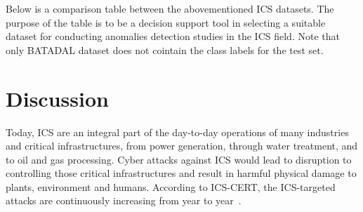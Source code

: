 \documentclass[english,12pt]{article}
\begin{document}
Below is a comparison table between the abovementioned ICS datasets. The purpose of the table is to be a
decision support tool in selecting a suitable dataset for conducting anomalies detection studies in the
ICS field. Note that only BATADAL dataset does not cointain the class labels for the test set.

\pagebreak{}

\section{Discussion} \label{discussion}

Today, ICS are an integral part of the day-to-day operations of many industries and critical infrastructures,
from power generation, through water treatment, and to oil and gas processing. Cyber attacks against ICS would
lead to disruption to controlling those critical infrastructures and result in harmful physical damage to plants,
environment and humans. According to ICS-CERT, the ICS-targeted attacks are continuously increasing from year to year~\cite{DBLP:conf/dsn/FengLC17}.

\pagebreak{}




\end{document}
